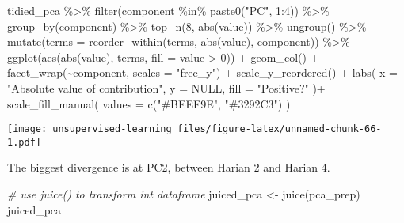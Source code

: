 \documentclass[
]{article}
\newenvironment{Shaded}{\begin{snugshade}}{\end{snugshade}}
\newcommand{\AttributeTok}[1]{\textcolor[rgb]{0.77,0.63,0.00}{#1}}
\newcommand{\CommentTok}[1]{\textcolor[rgb]{0.56,0.35,0.01}{\textit{#1}}}
\newcommand{\ConstantTok}[1]{\textcolor[rgb]{0.00,0.00,0.00}{#1}}
\newcommand{\DecValTok}[1]{\textcolor[rgb]{0.00,0.00,0.81}{#1}}
\newcommand{\FunctionTok}[1]{\textcolor[rgb]{0.00,0.00,0.00}{#1}}
\newcommand{\NormalTok}[1]{#1}
\newcommand{\OtherTok}[1]{\textcolor[rgb]{0.56,0.35,0.01}{#1}}
\newcommand{\SpecialCharTok}[1]{\textcolor[rgb]{0.00,0.00,0.00}{#1}}
\newcommand{\StringTok}[1]{\textcolor[rgb]{0.31,0.60,0.02}{#1}}
\begin{document}
\begin{Shaded}
\begin{Highlighting}[]
\NormalTok{tidied\_pca }\SpecialCharTok{\%\textgreater{}\%}
  \FunctionTok{filter}\NormalTok{(component }\SpecialCharTok{\%in\%} \FunctionTok{paste0}\NormalTok{(}\StringTok{"PC"}\NormalTok{, }\DecValTok{1}\SpecialCharTok{:}\DecValTok{4}\NormalTok{)) }\SpecialCharTok{\%\textgreater{}\%}
  \FunctionTok{group\_by}\NormalTok{(component) }\SpecialCharTok{\%\textgreater{}\%}
  \FunctionTok{top\_n}\NormalTok{(}\DecValTok{8}\NormalTok{, }\FunctionTok{abs}\NormalTok{(value)) }\SpecialCharTok{\%\textgreater{}\%}
  \FunctionTok{ungroup}\NormalTok{() }\SpecialCharTok{\%\textgreater{}\%}
  \FunctionTok{mutate}\NormalTok{(}\AttributeTok{terms =} \FunctionTok{reorder\_within}\NormalTok{(terms, }\FunctionTok{abs}\NormalTok{(value), component)) }\SpecialCharTok{\%\textgreater{}\%}
  \FunctionTok{ggplot}\NormalTok{(}\FunctionTok{aes}\NormalTok{(}\FunctionTok{abs}\NormalTok{(value), terms, }\AttributeTok{fill =}\NormalTok{ value }\SpecialCharTok{\textgreater{}} \DecValTok{0}\NormalTok{)) }\SpecialCharTok{+}
  \FunctionTok{geom\_col}\NormalTok{() }\SpecialCharTok{+}
  \FunctionTok{facet\_wrap}\NormalTok{(}\SpecialCharTok{\textasciitilde{}}\NormalTok{component, }\AttributeTok{scales =} \StringTok{"free\_y"}\NormalTok{) }\SpecialCharTok{+}
  \FunctionTok{scale\_y\_reordered}\NormalTok{() }\SpecialCharTok{+}
  \FunctionTok{labs}\NormalTok{(}
    \AttributeTok{x =} \StringTok{"Absolute value of contribution"}\NormalTok{,}
    \AttributeTok{y =} \ConstantTok{NULL}\NormalTok{, }\AttributeTok{fill =} \StringTok{"Positive?"}
\NormalTok{  )}\SpecialCharTok{+}
  \FunctionTok{scale\_fill\_manual}\NormalTok{(}
    \AttributeTok{values =} \FunctionTok{c}\NormalTok{(}\StringTok{"\#BEEF9E"}\NormalTok{, }\StringTok{"\#3292C3"}\NormalTok{)}
\NormalTok{  )}
\end{Highlighting}
\end{Shaded}

\texttt{[image: unsupervised-learning\_files/figure-latex/unnamed-chunk-66-1.pdf]}

The biggest divergence is at PC2, between Harian 2 and Harian 4.

\begin{Shaded}
\begin{Highlighting}[]
\CommentTok{\# use juice() to transform int dataframe}
\NormalTok{juiced\_pca }\OtherTok{\textless{}{-}} \FunctionTok{juice}\NormalTok{(pca\_prep)}
\NormalTok{juiced\_pca }
\end{Highlighting}
\end{Shaded}
\end{document}
